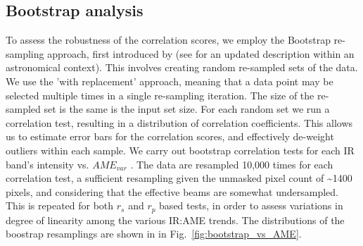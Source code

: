     \subsection{Bootstrap analysis}
        To assess the robustness of the correlation scores, we employ the Bootstrap re-sampling approach, first introduced by \cite{efron79} (see \cite{feigelson13} for an updated description within an astronomical context). This involves creating random re-sampled sets of the data. We use the 'with replacement' approach, meaning that a data point may be selected multiple times in a single re-sampling iteration. The size of the re-sampled set is the same is the input set size. For each random set we run a correlation test, resulting in a distribution of correlation coefficients. This allows us to estimate error bars for the correlation scores, and effectively de-weight outliers within each sample.
        We carry out bootstrap correlation tests for each IR band's intensity vs. $AME_{var}$ . The data are resampled 10,000 times for each correlation test, a sufficient resampling given the unmasked pixel count of \textasciitilde{}1400 pixels, and considering that the effective beams are somewhat undersampled. This is repeated for both $r_{s}$ and $r_{p}$ based tests, in order to assess variations in degree of linearity among the various IR:AME trends. The distributions of the boostrap resamplings are shown in in Fig.~\ref{fig:bootstrap_vs_AME}.
